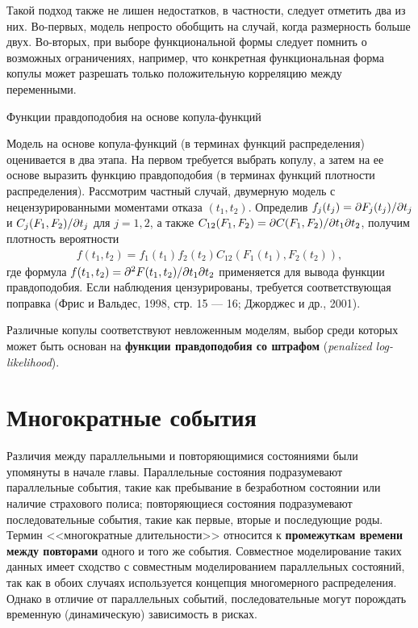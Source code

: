 Такой подход также не лишен недостатков, в частности, следует отметить два из них. Во-первых, модель непросто обобщить на случай, когда размерность больше двух. Во-вторых, при выборе функциональной формы следует помнить о возможных ограничениях, например, что конкретная функциональная форма копулы может разрешать только положительную корреляцию между переменными.


        \begin{center}Функции правдоподобия на основе копула-функций\end{center}
        \noindent
Модель на основе копула-функций (в терминах функций распределения) оценивается в два этапа. На первом требуется выбрать копулу, а затем на ее основе выразить функцию правдоподобия (в терминах функций плотности распределения). Рассмотрим частный случай, двумерную модель с нецензурированными моментами отказа $(t_1, t_2)$. Определив $f_j(t_j) = \partial F_j(t_j) / \partial t_j$ и $C_j(F_1, F_2) / \partial t_j$ для $j = 1, 2$, а также $C_{12}(F_1, F_2) = \partial C(F_1, F_2) / \partial t_1 \partial t_2$, получим плотность вероятности
    \begin{align}\label{eq:19.23}
    f(t_1,t_2) = f_1(t_1) f_2(t_2) C_{12} (F_1(t_1), F_2(t_2)),
    \end{align}
где формула $f(t_1, t_2) = \partial^2 F(t_1, t_2) / \partial t_1 \partial t_2$ применяется для вывода функции правдоподобия. Если наблюдения цензурированы, требуется соответствующая поправка (Фрис и Вальдес, 1998, стр. 15 --- 16; Джорджес и др., 2001). 

Различные копулы соответствуют невложенным моделям, %
выбор среди которых может быть основан на \textbf{функции правдоподобия со штрафом} (\textit{penalized log-likelihood}). %

\section{Многократные события}\label{sec:19.4}

\noindent
Различия между параллельными и повторяющимися состояниями были упомянуты в начале главы. Параллельные состояния подразумевают параллельные события, такие как пребывание в безработном состоянии или наличие страхового полиса; повторяющиеся состояния подразумевают последовательные события, такие как первые, вторые и последующие роды. Термин <<многократные длительности>> относится к \textbf{промежуткам времени между повторами} одного и того же события. Совместное моделирование таких данных имеет сходство с совместным моделированием параллельных состояний, так как в обоих случаях используется концепция многомерного распределения. Однако в отличие от параллельных событий, последовательные могут порождать временную (динамическую) зависимость в рисках.

